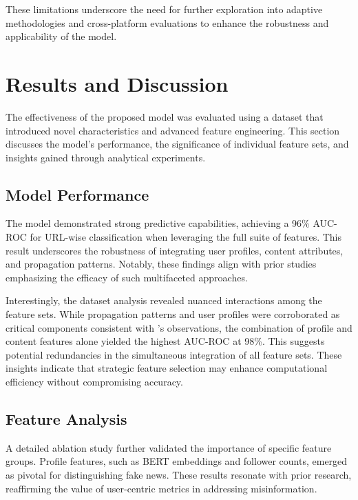 \documentclass[sigconf,nonacm]{acmart}
\begin{document}
These limitations underscore the need for further exploration into adaptive methodologies and cross-platform evaluations to enhance the robustness and applicability of the model.



\section{Results and Discussion}

The effectiveness of the proposed model was evaluated using a dataset that introduced novel characteristics and advanced feature engineering. This section discusses the model's performance, the significance of individual feature sets, and insights gained through analytical experiments.

\subsection{Model Performance}

The model demonstrated strong predictive capabilities, achieving a 96\% AUC-ROC for URL-wise classification when leveraging the full suite of features. This result underscores the robustness of integrating user profiles, content attributes, and propagation patterns. Notably, these findings align with prior studies emphasizing the efficacy of such multifaceted approaches.

Interestingly, the dataset analysis revealed nuanced interactions among the feature sets. While propagation patterns and user profiles were corroborated as critical components consistent with \cite{monti2019fakenewsdetectionsocial}'s observations, the combination of profile and content features alone yielded the highest AUC-ROC at 98\%. This suggests potential redundancies in the simultaneous integration of all feature sets. These insights indicate that strategic feature selection may enhance computational efficiency without compromising accuracy.

\subsection{Feature Analysis}

A detailed ablation study further validated the importance of specific feature groups. Profile features, such as BERT embeddings and follower counts, emerged as pivotal for distinguishing fake news. These results resonate with prior research, reaffirming the value of user-centric metrics in addressing misinformation.
\end{document}
